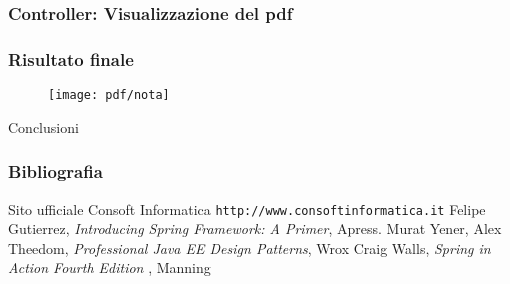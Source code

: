 \documentclass[]{beamer}
\begin{document}
    \begin{frame}
        \frametitle{Controller: Visualizzazione del pdf}
        
    \end{frame}

    \begin{frame}
        \frametitle{Risultato finale}
        \begin{figure}[H]
            \texttt{[image: pdf/nota]}\label{fig:nota}
        \end{figure}
    \end{frame}

    \begin{frame}
        \begin{center}          
            \huge Conclusioni
        \end{center}
    \end{frame}

    \begin{frame}
        \frametitle{Bibliografia}
        \begin{thebibliography}{9}
             Sito ufficiale Consoft Informatica 
            \newline
            \texttt{http://www.consoftinformatica.it}
            Felipe Gutierrez, 
            \emph{Introducing Spring Framework: A Primer}, Apress.
            \newline
            Murat Yener, Alex Theedom,
            \emph{Professional Java EE Design Patterns}, Wrox
            \newline
            Craig Walls,
            \emph{Spring in Action Fourth Edition }, Manning
            \newline
        \end{thebibliography}
    \end{frame}
\end{document}
